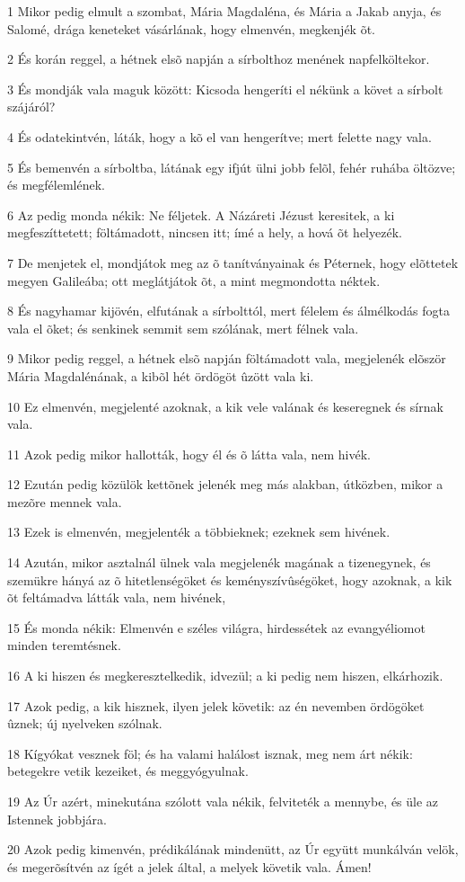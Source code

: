 \par 1 Mikor pedig elmult a szombat, Mária Magdaléna, és Mária a Jakab anyja, és Salomé, drága keneteket vásárlának, hogy elmenvén, megkenjék õt.
\par 2 És korán reggel, a hétnek elsõ napján a sírbolthoz menének napfelköltekor.
\par 3 És mondják vala maguk között: Kicsoda hengeríti el nékünk a követ a sírbolt szájáról?
\par 4 És odatekintvén, láták, hogy a kõ el van hengerítve; mert felette nagy vala.
\par 5 És bemenvén a sírboltba, látának egy ifjút ülni jobb felõl, fehér ruhába öltözve; és megfélemlének.
\par 6 Az pedig monda nékik: Ne féljetek. A Názáreti Jézust keresitek, a ki megfeszíttetett; föltámadott, nincsen itt; ímé a hely, a hová õt helyezék.
\par 7 De menjetek el, mondjátok meg az õ tanítványainak és Péternek, hogy elõttetek megyen Galileába; ott meglátjátok õt, a mint megmondotta néktek.
\par 8 És nagyhamar kijövén, elfutának a sírbolttól, mert félelem és álmélkodás fogta vala el õket; és senkinek semmit sem szólának, mert félnek vala.
\par 9 Mikor pedig reggel, a hétnek elsõ napján föltámadott vala, megjelenék elõször Mária Magdalénának, a kibõl hét ördögöt ûzött vala ki.
\par 10 Ez elmenvén, megjelenté azoknak, a kik vele valának és keseregnek és sírnak vala.
\par 11 Azok pedig mikor hallották, hogy él és õ látta vala, nem hivék.
\par 12 Ezután pedig közülök kettõnek jelenék meg más alakban, útközben, mikor a mezõre mennek vala.
\par 13 Ezek is elmenvén, megjelenték a többieknek; ezeknek sem hivének.
\par 14 Azután, mikor asztalnál ülnek vala megjelenék magának a tizenegynek, és szemükre hányá az õ hitetlenségöket és keményszívûségöket, hogy azoknak, a kik õt feltámadva látták vala, nem hivének,
\par 15 És monda nékik: Elmenvén e széles világra, hirdessétek az evangyéliomot minden teremtésnek.
\par 16 A ki hiszen és megkeresztelkedik, idvezül; a ki pedig nem hiszen, elkárhozik.
\par 17 Azok pedig, a kik hisznek, ilyen jelek követik: az én nevemben ördögöket ûznek;  új nyelveken szólnak.
\par 18 Kígyókat vesznek föl; és ha valami halálost isznak, meg nem árt nékik: betegekre  vetik kezeiket, és meggyógyulnak.
\par 19 Az Úr azért, minekutána szólott vala nékik, felviteték a mennybe, és üle az Istennek jobbjára.
\par 20 Azok pedig kimenvén, prédikálának mindenütt, az Úr együtt munkálván velök, és megerõsítvén az ígét a jelek által, a melyek követik vala. Ámen!


